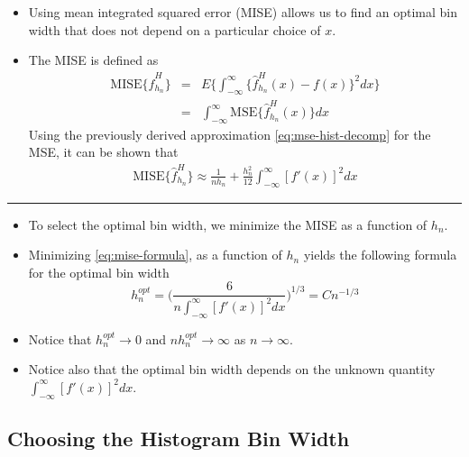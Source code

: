 \documentclass[]{book}
\begin{document}
\begin{itemize}
\item
  Using mean integrated squared error (MISE) allows us to find an optimal bin width
  that does not depend on a particular choice of \(x\).
\item
  The MISE is defined as
  \begin{eqnarray}
  \textrm{MISE}\{ \hat{f}_{h_{n}}^{H} \} 
  &=& E\Big\{ \int_{-\infty}^{\infty} \{ \hat{f}_{h_{n}}^{H}(x) - f(x) \}^{2}dx   \Big\} \nonumber \\
  &=& \int_{-\infty}^{\infty} \textrm{MSE}\{ \hat{f}_{h_{n}}^{H}(x) \} dx \nonumber
  \end{eqnarray}
  Using the previously derived approximation \eqref{eq:mse-hist-decomp} for the MSE, it can be shown that
  \begin{eqnarray}
  \textrm{MISE}\{ \hat{f}_{h_{n}}^{H} \} \approx
  \frac{1}{nh_{n}} + \frac{h_{n}^{2}}{12}\int_{-\infty}^{\infty} [f'(x)]^{2} dx  
  \label{eq:mise-formula}
  \end{eqnarray}
\end{itemize}

\begin{center}\rule{0.5\linewidth}{\linethickness}\end{center}

\begin{itemize}
\item
  To select the optimal bin width, we minimize the MISE as a function of \(h_{n}\).
\item
  Minimizing \eqref{eq:mise-formula}, as a function of \(h_{n}\) yields the following formula for the optimal bin width
  \begin{equation}
  h_{n}^{opt} = \Big( \frac{6}{n \int_{-\infty}^{\infty} [f'(x)]^{2} dx}  \Big)^{1/3} = C n^{-1/3} 
  \label{eq:opt-binwidth-hist}
  \end{equation}
\item
  Notice that \(h_{n}^{opt} \longrightarrow 0\) and \(nh_{n}^{opt} \longrightarrow \infty\) as \(n \longrightarrow \infty\).
\item
  Notice also that the optimal bin width depends on the unknown quantity \(\int_{-\infty}^{\infty} [f'(x)]^{2} dx\).
\end{itemize}

\hypertarget{choosing-the-histogram-bin-width}{%
\subsection{Choosing the Histogram Bin Width}\label{choosing-the-histogram-bin-width}}
\end{document}
